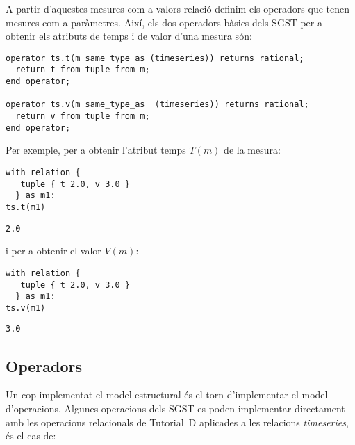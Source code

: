 A partir d'aquestes mesures com a valors relació definim els operadors
que tenen mesures com a paràmetres. Així, els dos operadors bàsics
dels \gls{SGST} per a obtenir els atributs de temps i de valor d'una mesura
són:
\begin{lstlisting}[style=tutorialD]
operator ts.t(m same_type_as (timeseries)) returns rational;
  return t from tuple from m;
end operator;

operator ts.v(m same_type_as  (timeseries)) returns rational;
  return v from tuple from m;
end operator;
\end{lstlisting}


Per exemple, per a obtenir l'atribut temps $T(m)$ de la mesura:
\begin{lstlisting}[style=tutorialD]
with relation {
   tuple { t 2.0, v 3.0 }
  } as m1: 
ts.t(m1)
\end{lstlisting}
\begin{lstlisting}[style=stdout]
2.0
\end{lstlisting}
i per a obtenir el valor $V(m)$:
\begin{lstlisting}[style=tutorialD]
with relation {
   tuple { t 2.0, v 3.0 }
  } as m1: 
ts.v(m1)
\end{lstlisting}
\begin{lstlisting}[style=stdout]
3.0
\end{lstlisting}



\subsection{Operadors}

Un cop implementat el model estructural és el torn d'implementar el
model d'operacions.  Algunes operacions dels \gls{SGST} es poden
implementar directament amb les operacions relacionals de Tutorial~D
aplicades a les relacions \emph{timeseries}, és el cas de:

